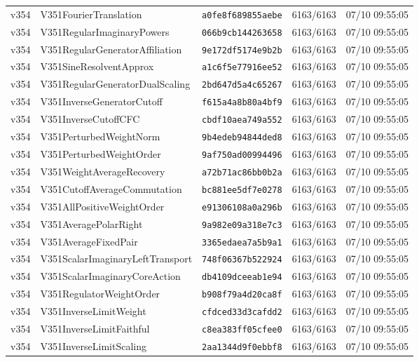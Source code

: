 \documentclass[11pt]{article}
\theoremstyle{definition}\newtheorem{deriv}{Derivação}
\begin{document}
{\begin{longtable}{@{}lllll@{}}
v354 & V351FourierTranslation & \texttt{a0fe8f689855aebe} & 6163/6163 & 07/10 09:55:05 \\
v354 & V351RegularImaginaryPowers & \texttt{066b9cb144263658} & 6163/6163 & 07/10 09:55:05 \\
v354 & V351RegularGeneratorAffiliation & \texttt{9e172df5174e9b2b} & 6163/6163 & 07/10 09:55:05 \\
v354 & V351SineResolventApprox & \texttt{a1c6f5e77916ee52} & 6163/6163 & 07/10 09:55:05 \\
v354 & V351RegularGeneratorDualScaling & \texttt{2bd647d5a4c65267} & 6163/6163 & 07/10 09:55:05 \\
v354 & V351InverseGeneratorCutoff & \texttt{f615a4a8b80a4bf9} & 6163/6163 & 07/10 09:55:05 \\
v354 & V351InverseCutoffCFC & \texttt{cbdf10aea749a552} & 6163/6163 & 07/10 09:55:05 \\
v354 & V351PerturbedWeightNorm & \texttt{9b4edeb94844ded8} & 6163/6163 & 07/10 09:55:05 \\
v354 & V351PerturbedWeightOrder & \texttt{9af750ad00994496} & 6163/6163 & 07/10 09:55:05 \\
v354 & V351WeightAverageRecovery & \texttt{a72b71ac86bb0b2a} & 6163/6163 & 07/10 09:55:05 \\
v354 & V351CutoffAverageCommutation & \texttt{bc881ee5df7e0278} & 6163/6163 & 07/10 09:55:05 \\
v354 & V351AllPositiveWeightOrder & \texttt{e91306108a0a296b} & 6163/6163 & 07/10 09:55:05 \\
v354 & V351AveragePolarRight & \texttt{9a982e09a318e7c3} & 6163/6163 & 07/10 09:55:05 \\
v354 & V351AverageFixedPair & \texttt{3365edaea7a5b9a1} & 6163/6163 & 07/10 09:55:05 \\
v354 & V351ScalarImaginaryLeftTransport & \texttt{748f06367b522924} & 6163/6163 & 07/10 09:55:05 \\
v354 & V351ScalarImaginaryCoreAction & \texttt{db4109dceeab1e94} & 6163/6163 & 07/10 09:55:05 \\
v354 & V351RegulatorWeightOrder & \texttt{b908f79a4d20ca8f} & 6163/6163 & 07/10 09:55:05 \\
v354 & V351InverseLimitWeight & \texttt{cfdced33d3cafdd2} & 6163/6163 & 07/10 09:55:05 \\
v354 & V351InverseLimitFaithful & \texttt{c8ea383ff05cfee0} & 6163/6163 & 07/10 09:55:05 \\
v354 & V351InverseLimitScaling & \texttt{2aa1344d9f0ebbf8} & 6163/6163 & 07/10 09:55:05 \\

\end{longtable}}
\end{document}
